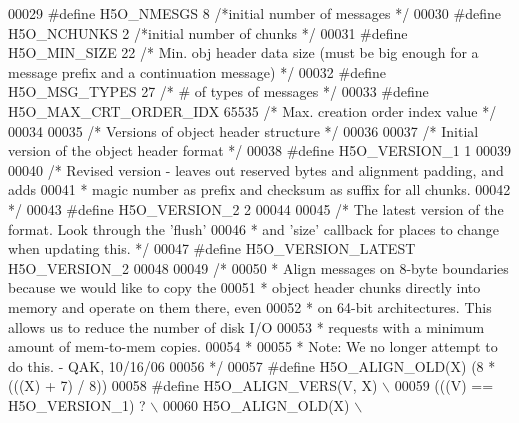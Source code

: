 \begin{DoxyCode}
00029 \textcolor{preprocessor}{#define H5O\_NMESGS  8       }\textcolor{comment}{/*initial number of messages         */}\textcolor{preprocessor}{}
00030 \textcolor{preprocessor}{#define H5O\_NCHUNKS 2       }\textcolor{comment}{/*initial number of chunks       */}\textcolor{preprocessor}{}
00031 \textcolor{preprocessor}{#define H5O\_MIN\_SIZE    22      }\textcolor{comment}{/* Min. obj header data size (must be big enough for a message prefix and a
       continuation message) */}\textcolor{preprocessor}{}
00032 \textcolor{preprocessor}{#define H5O\_MSG\_TYPES   27              }\textcolor{comment}{/* # of types of messages            */}\textcolor{preprocessor}{}
00033 \textcolor{preprocessor}{#define H5O\_MAX\_CRT\_ORDER\_IDX 65535     }\textcolor{comment}{/* Max. creation order index value   */}\textcolor{preprocessor}{}
00034 
00035 \textcolor{comment}{/* Versions of object header structure */}
00036 
00037 \textcolor{comment}{/* Initial version of the object header format */}
00038 \textcolor{preprocessor}{#define H5O\_VERSION\_1       1}
00039 
00040 \textcolor{comment}{/* Revised version - leaves out reserved bytes and alignment padding, and adds}
00041 \textcolor{comment}{ *      magic number as prefix and checksum as suffix for all chunks.}
00042 \textcolor{comment}{ */}
00043 \textcolor{preprocessor}{#define H5O\_VERSION\_2       2}
00044 
00045 \textcolor{comment}{/* The latest version of the format.  Look through the 'flush'}
00046 \textcolor{comment}{ *      and 'size' callback for places to change when updating this. */}
00047 \textcolor{preprocessor}{#define H5O\_VERSION\_LATEST  H5O\_VERSION\_2}
00048 
00049 \textcolor{comment}{/*}
00050 \textcolor{comment}{ * Align messages on 8-byte boundaries because we would like to copy the}
00051 \textcolor{comment}{ * object header chunks directly into memory and operate on them there, even}
00052 \textcolor{comment}{ * on 64-bit architectures.  This allows us to reduce the number of disk I/O}
00053 \textcolor{comment}{ * requests with a minimum amount of mem-to-mem copies.}
00054 \textcolor{comment}{ *}
00055 \textcolor{comment}{ * Note: We no longer attempt to do this. - QAK, 10/16/06}
00056 \textcolor{comment}{ */}
00057 \textcolor{preprocessor}{#define H5O\_ALIGN\_OLD(X)    (8 * (((X) + 7) / 8))}
00058 \textcolor{preprocessor}{#define H5O\_ALIGN\_VERS(V, X)                              \(\backslash\)}
00059 \textcolor{preprocessor}{    (((V) == H5O\_VERSION\_1) ?                             \(\backslash\)}
00060 \textcolor{preprocessor}{        H5O\_ALIGN\_OLD(X)                          \(\backslash\)}

\end{DoxyCode}
